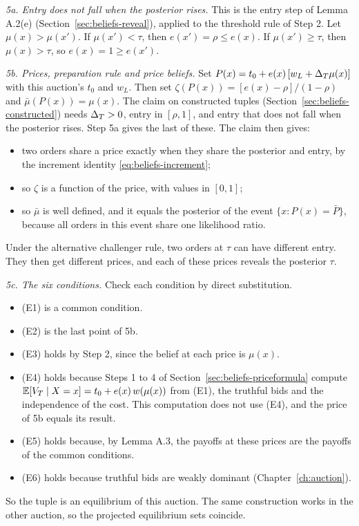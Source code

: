 \emph{5a. Entry does not fall when the posterior rises.} This is the entry step of Lemma A.2(e)
(Section~\ref{sec:beliefs-reveal}), applied to the threshold rule of Step 2. Let \(\mu(x)>\mu(x')\). If \(\mu(x')<\tau\), then
\(e(x')=\rho\le e(x)\). If \(\mu(x')\ge\tau\), then \(\mu(x)>\tau\), so \(e(x)=1\ge e(x')\).

\emph{5b. Prices, preparation rule and price beliefs.} Set \(P(x)=t_0+e(x)\,[w_L+\Delta_T\mu(x)]\) with this
auction's \(t_0\) and \(w_L\). Then set \(\zeta(P(x))=[e(x)-\rho]/(1-\rho)\) and \(\bar\mu(P(x))=\mu(x)\). The
claim on constructed tuples (Section~\ref{sec:beliefs-constructed}) needs \(\Delta_T>0\), entry in \([\rho,1]\), and
entry that does not fall when the posterior rises. Step 5a gives the last of these. The claim then gives:
\begin{itemize}
\item two orders share a price exactly when they share the posterior and entry, by the increment identity
\eqref{eq:beliefs-increment};
\item so \(\zeta\) is a function of the price, with values in \([0,1]\);
\item so \(\bar\mu\) is well defined, and it equals the posterior of the event \(\{x:P(x)=\bar P\}\), because all
orders in this event share one likelihood ratio.
\end{itemize}
Under the alternative challenger rule, two orders at \(\tau\) can have different entry. They then get different
prices, and each of these prices reveals the posterior \(\tau\).

\emph{5c. The six conditions.} Check each condition by direct substitution.
\begin{itemize}
\item (E1) is a common condition.
\item (E2) is the last point of 5b.
\item (E3) holds by Step 2, since the belief at each price is \(\mu(x)\).
\item (E4) holds because Steps 1 to 4 of Section~\ref{sec:beliefs-priceformula} compute
\(\mathbb{E}[V_T\mid X=x]=t_0+e(x)\,w(\mu(x))\) from (E1), the truthful bids and the independence of the cost. This
computation does not use (E4), and the price of 5b equals its result.
\item (E5) holds because, by Lemma A.3, the payoffs at these prices are the payoffs of the common conditions.
\item (E6) holds because truthful bids are weakly dominant (Chapter~\ref{ch:auction}).
\end{itemize}
So the tuple is an equilibrium of this auction. The same construction works in the other auction, so the projected
equilibrium sets coincide.

